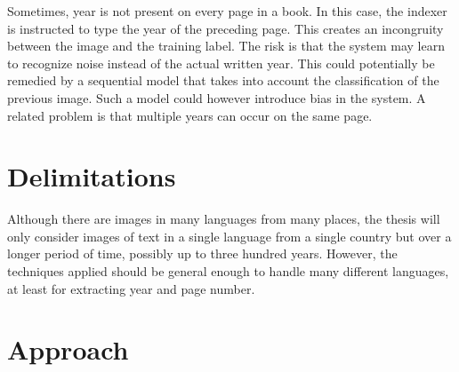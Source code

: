 Sometimes, year is not present on every page in a book. In this case, the indexer is instructed to type the year of the preceding page. This creates an incongruity between the image and the training label. The risk is that the system may learn to recognize noise instead of the actual written year. This could potentially be remedied by a sequential model that takes into account the classification of the previous image. Such a model could however introduce bias in the system.
A related problem is that multiple years can occur on the same page.






\section{Delimitations}

Although there are images in many languages from many places, the thesis will only consider images of text in a single language from a single country but over a longer period of time, possibly up to three hundred years.
However, the techniques applied should be general enough to handle many different languages, at least for extracting year and page number.


\section{Approach}



